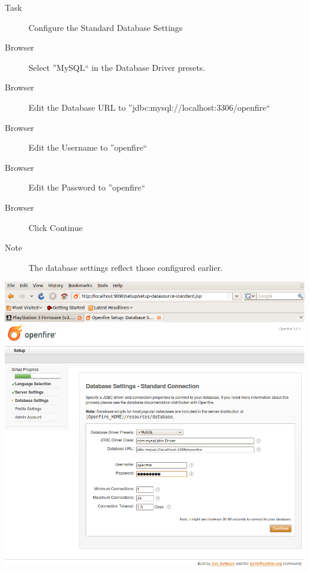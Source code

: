 \begin{description}
\item [Task] Configure the Standard Database Settings
\item [Browser] Select ''MySQL`` in the Database Driver presets.
\item [Browser] Edit the Database URL to ''jdbc:mysql://localhost:3306/openfire``
\item [Browser] Edit the Username to ''openfire``
\item [Browser] Edit the Password to ''openfire``
\item [Browser] Click Continue
\item[Note] The database settings reflect those configured earlier.
\end{description}
\begin{center}
\includegraphics[scale=0.5]{figs/deploy/openfire-4.png} 
\end{center}



